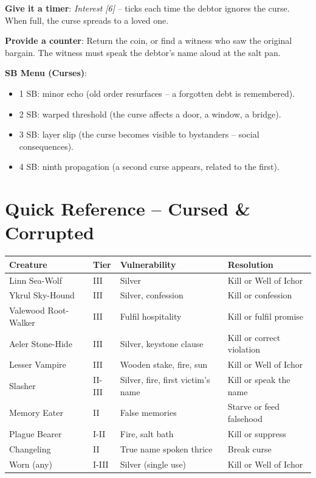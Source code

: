 \noindent\textbf{Give it a timer}: 
\emph{Interest [6]} -- ticks each time the debtor ignores the curse. When full, the curse spreads to a loved one.

\noindent\textbf{Provide a counter}: 
Return the coin, or find a witness who saw the original bargain. The witness must speak the debtor's name aloud at the salt pan.

\noindent\textbf{SB Menu (Curses)}:
\begin{itemize}
    \item 1 SB: minor echo (old order resurfaces -- a forgotten debt is remembered).
    \item 2 SB: warped threshold (the curse affects a door, a window, a bridge).
    \item 3 SB: layer slip (the curse becomes visible to bystanders -- social consequences).
    \item 4 SB: ninth propagation (a second curse appears, related to the first).
\end{itemize}


\section*{Quick Reference -- Cursed & Corrupted}

\begin{tabular}{|l|l|l|l|}
\hline
\textbf{Creature} & \textbf{Tier} & \textbf{Vulnerability} & \textbf{Resolution} \\
\hline
Linn Sea-Wolf & III & Silver & Kill or Well of Ichor \\
Ykrul Sky-Hound & III & Silver, confession & Kill or confession \\
Valewood Root-Walker & III & Fulfil hospitality & Kill or fulfil promise \\
Aeler Stone-Hide & III & Silver, keystone clause & Kill or correct violation \\
Lesser Vampire & III & Wooden stake, fire, sun & Kill or Well of Ichor \\
Slasher & II-III & Silver, fire, first victim's name & Kill or speak the name \\
Memory Eater & II & False memories & Starve or feed falsehood \\
Plague Bearer & I-II & Fire, salt bath & Kill or suppress \\
Changeling & II & True name spoken thrice & Break curse \\
Worn (any) & I-III & Silver (single use) & Kill or Well of Ichor \\
\hline
\end{tabular}

